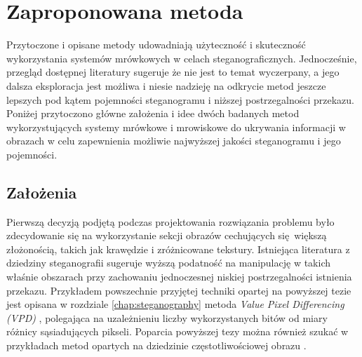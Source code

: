 {    \section{Zaproponowana metoda}
    {
        Przytoczone i opisane metody udowadniają użyteczność i skuteczność wykorzystania systemów mrówkowych w celach
        steganograficznych. Jednocześnie, przegląd dostępnej literatury sugeruje że nie jest to temat wyczerpany, a jego
        dalsza eksploracja jest możliwa i niesie nadzieję na odkrycie metod jeszcze lepszych pod kątem pojemności
        steganogramu i niższej postrzegalności przekazu. Poniżej przytoczono główne założenia i idee dwóch badanych
        metod wykorzystujących systemy mrówkowe i mrowiskowe do ukrywania informacji w obrazach w celu zapewnienia
        możliwie najwyższej jakości steganogramu i jego pojemności.

        \subsection{Założenia}
        {
            Pierwszą decyzją podjętą podczas projektowania rozwiązania problemu było zdecydowanie się na wykorzystanie
            sekcji obrazów cechujących się większą złożonością, takich jak krawędzie i zróżnicowane tekstury. Istniejąca
            literatura z dziedziny steganografii sugeruje wyższą podatność na manipulację w takich właśnie obszarach
            przy zachowaniu jednoczesnej niskiej postrzegalności istnienia przekazu. Przykładem powszechnie przyjętej
            techniki opartej na powyższej tezie jest opisana w rozdziale \ref{chap:steganography} metoda \textit{Value
            Pixel Differencing \textnormal{(}VPD\textnormal{)}} \cite{Wu2003ASM}, polegająca na uzależnieniu liczby
            wykorzystanych bitów od miary różnicy sąsiadujących pikseli. Poparcia powyższej tezy można również szukać w
            przykładach metod opartych na dziedzinie częstotliwościowej obrazu \cite{Xuan2005LosslessDH}.

}}}
